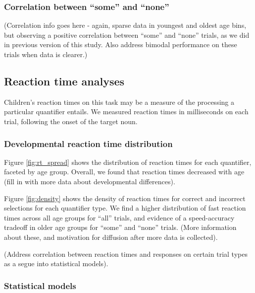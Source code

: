 \documentclass[10pt, letterpaper]{article}
\begin{document}
\subsubsection{Correlation between ``some'' and
``none''}\label{correlation-between-some-and-none}

(Correlation info goes here - again, sparse data in youngest and oldest
age bins, but observing a positive correlation between ``some'' and
``none'' trials, as we did in previous version of this study. Also
address bimodal performance on these trials when data is clearer.)

\subsection{Reaction time analyses}\label{reaction-time-analyses}

Children's reaction times on this task may be a measure of the
processing a particular quantifier entails. We measured reaction times
in milliseconds on each trial, following the onset of the target noun.

\subsubsection{Developmental reaction time
distribution\\}\label{developmental-reaction-time-distribution}

Figure \ref{fig:rt_spread} shows the distribution of reaction times for
each quantifier, faceted by age group. Overall, we found that reaction
times decreased with age (fill in with more data about developmental
differences).

Figure \ref{fig:density} shows the density of reaction times for correct
and incorrect selections for each quantifier type. We find a higher
distribution of fast reaction times across all age groups for ``all''
trials, and evidence of a speed-accuracy tradeoff in older age groups
for ``some'' and ``none'' trials. (More information about these, and
motivation for diffusion after more data is collected).

(Address correlation between reaction times and responses on certain
trial types as a segue into statistical models).

\subsubsection{Statistical models}\label{statistical-models}
\end{document}
